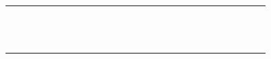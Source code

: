 \documentclass{article}
\renewcommand\_{\textunderscore\allowbreak}
\begin{document}
\begin{table}
\begin{tabular}{p{4.5cm}*{26}{D}}
\citet{peiselerCarbonFootprintDistributions2024} &  & \X & \X &  & \X &  &  & \X & \X &  & \X &  &  &  & \X &  &  &  & \X &  &  & \X &  & \X &  & \X \\
\anonstrut\textcolor{codelabel}{} & \X &  &  &  &  &  & \X &  &  & \X &  & \X &  & \X & \X & \X & \X &  &  &  &  &  &  &  &  &  \\
\anonstrut\textcolor{codelabel}{} & \X &  & \X & \X &  &  &  &  &  & \X &  & \X &  &  & \X & \X & \X &  &  &  &  &  &  &  &  &  \\
\anonstrut\textcolor{codelabel}{} & \X &  &  & \X &  &  &  &  &  & \X &  &  &  &  & \X &  &  &  &  &  &  &  &  &  &  &  \\
\anonstrut\textcolor{codelabel}{} & \X &  & \X & \X &  &  &  &  &  & \X & \X &  &  &  & \X & \X & \X &  &  &  & \X &  &  &  & \X &  \\
\anonstrut\textcolor{codelabel}{} &  & \X & \X & \X &  &  &  &  &  & \X &  & \X &  &  &  &  & \X &  &  &  &  &  &  & \X &  &  \\
\anonstrut\textcolor{codelabel}{} & \X &  &  &  & \X &  &  &  &  & \X & \X &  &  & \X & \X & \X & \X &  &  &  &  &  &  &  & \X &  \\
\anonstrut\textcolor{codelabel}{} & \X &  &  &  & \X &  &  &  &  & \X &  &  &  &  & \X &  &  & \X &  &  &  &  &  &  &  &  \\
\anonstrut\textcolor{codelabel}{} & \X &  & \X &  & \X &  &  & \X &  & \X &  &  &  &  & \X & \X & \X &  &  &  &  &  &  &  &  & \X \\
\anonstrut\textcolor{codelabel}{} & \X &  & \X &  & \X & \X & \X &  &  & \X &  & \X & \X &  &  &  &  &  &  & \X &  &  &  &  &  &  \\
\citet{sunRobustAssessmentsLithium2025} & \X &  & \X & \X & \X & \X & \X &  & \X & \X & \X &  &  &  & \X &  & \X &  &  &  & \X & \X &  &  &  &  \\
\anonstrut\textcolor{codelabel}{} &  & \X & \X &  & \X & \X &  &  &  &  &  &  & \X & \X & \X &  &  &  &  & \X &  &  &  &  &  &  \\
\anonstrut\textcolor{codelabel}{} & \X &  & \X & \X & \X & \X & \X &  &  & \X &  & \X &  &  &  &  &  &  &  & \X &  &  &  &  &  &  \\

\end{tabular}
\end{table}
\end{document}
